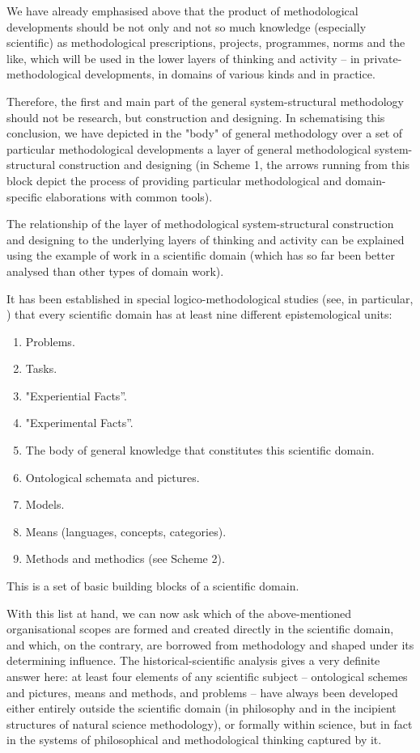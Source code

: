 \documentclass[11pt,a4paper]{article}
\begin{document}
We have already emphasised above that the product of methodological
developments should be not only and not so much knowledge (especially
scientific) as methodological prescriptions, projects, programmes, norms and
the like, which will be used in the lower layers of thinking and activity – in
private-methodological developments, in domains of various kinds and in
practice.

Therefore, the first and main part of the general system-structural
methodology should not be research, but construction and designing. In
schematising this conclusion, we have depicted in the "body" of general
methodology over a set of particular methodological developments a layer of
general methodological system-structural construction and designing (in Scheme
1, the arrows running from this block depict the process of providing
particular methodological and domain-specific elaborations with common tools).

The relationship of the layer of methodological system-structural construction
and designing to the underlying layers of thinking and activity can be
explained using the example of work in a scientific domain (which has so far
been better analysed than other types of domain work).

It has been established in special logico-methodological studies (see, in
particular, \cite[pp. 106-190]{Problems1967}) that every scientific domain has
at least nine different epistemological units:
\begin{enumerate}[noitemsep]
\item Problems. 
\item Tasks.
\item "Experiential Facts”. 
\item "Experimental Facts”.
\item The body of general knowledge that constitutes this scientific domain.
\item Ontological schemata and pictures. 
\item Models. 
\item Means (languages, concepts, categories). 
\item Methods and methodics (see Scheme 2). 
\end{enumerate}
This is a set of basic building blocks of a scientific domain.

With this list at hand, we can now ask which of the above-mentioned
organisational scopes are formed and created directly in the scientific
domain, and which, on the contrary, are borrowed from methodology and shaped
under its determining influence. The historical-scientific analysis gives a
very definite answer here: at least four elements of any scientific subject –
ontological schemes and pictures, means and methods, and problems – have
always been developed either entirely outside the scientific domain (in
philosophy and in the incipient structures of natural science methodology), or
formally within science, but in fact in the systems of philosophical and
methodological thinking captured by it. 
\end{document}
